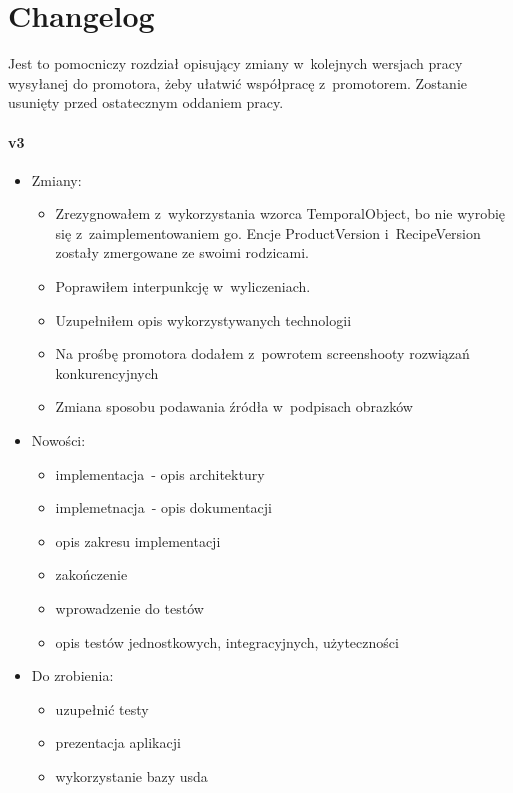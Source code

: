 \chapter*{Changelog}\label{ch:changelog}

Jest to pomocniczy rozdział opisujący zmiany w~kolejnych wersjach pracy wysyłanej do promotora, żeby ułatwić współpracę z~promotorem.
Zostanie usunięty przed ostatecznym oddaniem pracy.

\subsubsection{v3}
\begin{itemize}
\item Zmiany:
    \begin{itemize}
    	\item Zrezygnowałem z~wykorzystania wzorca TemporalObject, bo nie wyrobię się z~zaimplementowaniem go. Encje ProductVersion i~RecipeVersion zostały zmergowane ze swoimi rodzicami.
		\item Poprawiłem interpunkcję w~wyliczeniach.
		\item Uzupełniłem opis wykorzystywanych technologii
		\item Na prośbę promotora dodałem z~powrotem screenshooty rozwiązań konkurencyjnych
		\item Zmiana sposobu podawania źródła w~podpisach obrazków
	\end{itemize}
\item Nowości:
    \begin{itemize}
		\item implementacja~- opis architektury
		\item implemetnacja~- opis dokumentacji
		\item opis zakresu implementacji
		\item zakończenie
		\item wprowadzenie do testów
		\item opis testów jednostkowych, integracyjnych, użyteczności
	\end{itemize}
\item Do zrobienia:
    \begin{itemize}
        \item uzupełnić testy
        \item prezentacja aplikacji
        \item wykorzystanie bazy usda
	\end{itemize}
\end{itemize}

